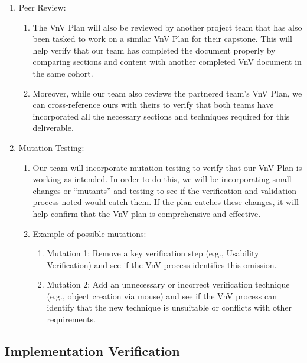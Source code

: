 \documentclass[12pt, titlepage]{article}
\begin{document}
\begin{enumerate}
\begin{enumerate}
\item Peer Review:
\begin{enumerate}
\item The VnV Plan will also be reviewed by another project
team that has also been tasked to work on a similar VnV
Plan for their capstone. This will help verify that our
team has completed the document properly by comparing
sections and content with another completed VnV document
in the same cohort.
\item Moreover, while our team also reviews the partnered
team’s VnV Plan, we can cross-reference ours with theirs to
verify that both teams have incorporated all the necessary
sections and techniques required for this deliverable.
\end{enumerate}

\item Mutation Testing:
\begin{enumerate}
\item Our team will incorporate mutation testing to verify that
our VnV Plan is working as intended. In order to do this,
we will be incorporating small changes or “mutants” and testing
to see if the verification and validation process noted would
catch them. If the plan catches these changes, it will help
confirm that the VnV plan is comprehensive and effective.
\item Example of possible mutations:
\begin{enumerate}
\item Mutation 1: Remove a key verification step
(e.g., Usability Verification) and see if the VnV
process identifies this omission.
\item Mutation 2: Add an unnecessary or incorrect
verification technique (e.g., object creation via mouse)
and see if the VnV process can identify that the new
technique is unsuitable or conflicts with other requirements.
\end{enumerate}
\end{enumerate}
\end{enumerate}
\end{enumerate}

\subsection{Implementation Verification}


\end{document}
